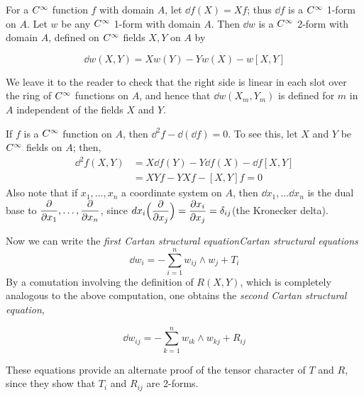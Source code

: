 \documentclass[../main]{subfiles}
\begin{document}
For a $C^\infty$ function $f$ with domain $A$, let $\dd f(X)=Xf$; thus $\dd f$ is a $C^\infty$ 1-form on $A$. Let $w$ be any $C^\infty$ 1-form with domain $A$. Then $\dd w$ is a $C^\infty$ 2-form with domain $A$, defined on $C^\infty$ fields $X,Y$ on $A$ by

\[\label{eqn:ch05.12}\tag{12} \dd w(X,Y) = Xw(Y)-Yw(X)-w[X,Y] \]

We leave it to the reader to check that the right side is linear in each slot over the ring of $C^\infty$ functions on $A$, and hence that $\dd w(X_m,Y_m)$ is defined for $m$ in $A$ independent of the fields $X$ and $Y$.

If $f$ is a $C^\infty$ function on $A$, then $\dd^2f - \dd(\dd f)=0$. To see this, let $X$ and $Y$ be $C^\infty$ fields on $A$; then,
\begin{align*}
    \dd^2f(X,Y) &= X\dd f(Y)-Y\dd f(X) - \dd f[X,Y]\\
    &= XYf-YXf -[X,Y]f=0
\end{align*}
Also note that if $x_1,\dots,x_n$ a coordinate system on $A$, then $\dd x_1,\dots \dd x_n$ is the dual base to $\dfrac{\partial }{\partial x_1},\dots ,\dfrac{\partial }{\partial x_n}$, since $dx_i\Big(\dfrac{\partial }{\partial x_j}\Big) = \dfrac{\partial x_i}{\partial x_j}=\delta_{ij}$(the Kronecker delta).

Now we can write the \emph{first Cartan structural equation}\emph{Cartan structural equations}
\[\label{eq:ch05.13}\tag{13} \dd w_i = -\sum_{i=1}^n w_{ij}\wedge w_j +T_i\]
By a comutation involving the definition of $R(X,Y)$, which is completely analogous to the above computation, one obtains the \emph{second Cartan structural equation},

\[\label{eq:ch05.14}\tag{14} \dd w_{ij} = -\sum_{k=1}^n w_{ik}\wedge w_{kj} +R_{ij}\]

These equations provide an alternate proof of the tensor character of $T$ and $R$, since they show that $T_i$ and $R_{ij}$ are 2-forms.
\end{document}
